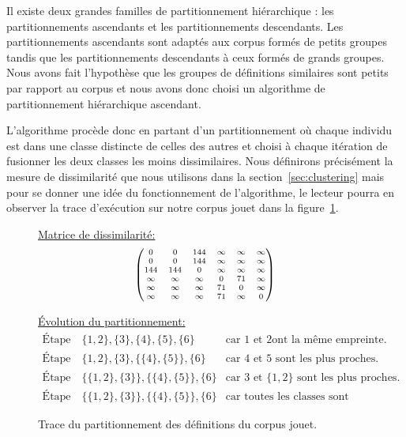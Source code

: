 Il existe deux grandes familles de partitionnement hiérarchique : les
partitionnements ascendants et les partitionnements descendants. Les
partitionnements ascendants sont adaptés aux corpus formés de petits
groupes tandis que les partitionnements descendants à ceux formés de
grands groupes. Nous avons fait l'hypothèse que les groupes de
définitions similaires sont petits par rapport au corpus et nous avons
donc choisi un algorithme de partitionnement hiérarchique ascendant.

L'algorithme procède donc en partant d'un partitionnement où chaque
individu est dans une classe distincte de celles des autres et choisi
à chaque itération de fusionner les deux classes les moins
dissimilaires. Nous définirons précisément la mesure de dissimilarité
que nous utilisons dans la section~\ref{sec:clustering} mais pour
se donner une idée du fonctionnement de l'algorithme, le lecteur
pourra en observer la trace d'exécution sur notre corpus jouet
dans la figure~\ref{fig:clustering-jouet}.

\begin{figure}
\underline{Matrice de dissimilarité:}
\[\scriptsize
\begin{pmatrix}
0 & 0 & 144 & \infty & \infty & \infty \\
0 & 0 & 144 & \infty & \infty & \infty \\
144 & 144 & 0 & \infty & \infty & \infty \\
\infty & \infty & \infty & 0 & 71 & \infty \\
\infty & \infty & \infty & 71 & 0 & \infty \\
\infty & \infty & \infty & 71 & \infty & 0 \\
\end{pmatrix}
\]

\underline{Évolution du partitionnement:}
\[
\begin{array}{rclr}
\text{Étape 1} & \{ 1, 2 \}, \{ 3 \}, \{ 4 \}, \{ 5 \}, \{ 6 \}
& \text{car }1 \text{ et } 2 \text{ont la même empreinte.} \\
\text{Étape 2} & \{ 1, 2 \}, \{ 3 \}, \{ \{ 4 \}, \{ 5 \} \}, \{ 6 \}
& \text{car }4 \text{ et } 5 \text{ sont les plus proches.} \\
\text{Étape 3} & \{ \{ 1, 2 \}, \{ 3 \} \}, \{ \{ 4 \}, \{ 5 \} \}, \{ 6 \}
& \text{car }3 \text{ et } \{ 1, 2 \} \text{ sont les plus proches.} \\
\text{Étape 4} & \{ \{ 1, 2 \}, \{ 3 \} \}, \{ \{ 4 \}, \{ 5 \} \}, \{ 6 \}
& \text{car toutes les classes sont absolument dissimilaires.}
\end{array}
\]

\caption{Trace du partitionnement des définitions du corpus jouet.}
\label{fig:clustering-jouet}
\end{figure}

